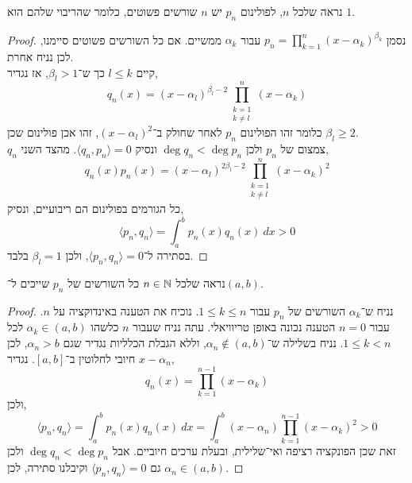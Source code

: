 \subquestion{}
נראה שלכל $n$, לפולינום $p_n$ יש $n$ שורשים פשוטים, כלומר שהריבוי שלהם הוא $1$.
\begin{proof}
	נסמן $p_n = \prod_{k = 1}^n {(x - \alpha_k)}^{\beta_k}$ עבור $\alpha_k$ ממשיים.
	אם כל השורשים פשוטים סיימנו, לכן נניח אחרת. \\
	קיים $l \le k$ כך ש־$\beta_l > 1$, אז נגדיר,
	\[
		q_n(x)
		= {(x - \alpha_l)}^{\beta_l - 2} \prod_{\substack{k = 1 \\ k \ne l}}^n (x - \alpha_k)
	\]
	כלומר זהו הפולינום $p_n$ לאחר שחולק ב־${(x - \alpha_l)}^2$, זהו אכן פולינום שכן $\beta_l \ge 2$. \\
	$q_n$ צמצום של $p_n$ ולכן $\deg q_n < \deg p_n$ ונסיק $\langle q_n, p_n \rangle = 0$.
	מהצד השני,
	\[
		q_n(x) p_n(x)
		= {(x - \alpha_l)}^{2\beta_l - 2} \prod_{\substack{k = 1 \\ k \ne l}}^n {(x - \alpha_k)}^2
	\]
	כל הגורמים בפולינום הם ריבועיים, ונסיק,
	\[
		\langle p_n, q_n \rangle
		= \int_{a}^{b} p_n(x) q_n(x)\ dx
		> 0
	\]
	בסתירה ל־$\langle p_n, q_n \rangle = 0$, ולכן $\beta_l = 1$ בלבד.
\end{proof}

\subquestion{}
נראה שלכל $n \in \mathbb{N}$ כל השורשים של $p_n$ שייכים ל־$(a, b)$.
\begin{proof}
	נניח ש־$\alpha_k$ השורשים של $p_n$ עבור $1 \le k \le n$.
	נוכיח את הטענה באינדוקציה על $n$.
	עבור $n = 0$ הטענה נכונה באופן טריוויאלי.
	עתה נניח שעבור $n$ כלשהו $\alpha_k \in (a, b)$ לכל $1 \le k < n$.
	נניח בשלילה ש־$\alpha_n \notin (a, b)$, וללא הגבלת הכלליות נגדיר שגם $\alpha_n > b$, לכן $x - \alpha_n$ חיובי לחלוטין ב־$[a, b]$.
	נגדיר,
	\[
		q_n(x)
		= \prod_{k = 1}^{n - 1} (x - \alpha_k)
	\]
	ולכן,
	\[
		\langle p_n, q_n \rangle
		= \int_{a}^{b} p_n(x) q_n(x)\ dx
		= \int_{a}^{b} (x - \alpha_n) \prod_{k = 1}^{n - 1} {(x - \alpha_k)}^2
		> 0
	\]
	זאת שכן הפונקציה רציפה ואי־שלילית, ובעלת ערכים חיוביים.
	אבל $\deg q_n < \deg p_n$ ולכן גם $\langle p_n, q_n \rangle = 0$ וקיבלנו סתירה, לכן $\alpha_n \in (a, b)$.
\end{proof}


